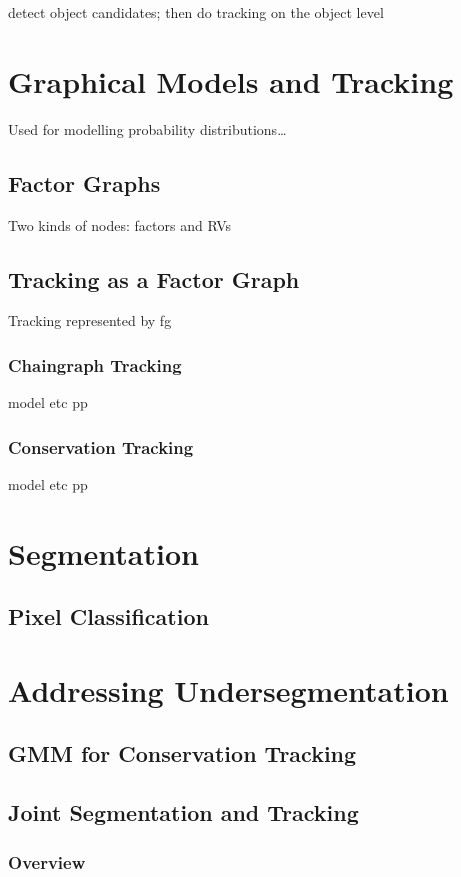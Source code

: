 \documentclass[11pt]{article}
\begin{document}
    detect object candidates; then do tracking on the object level
\section{Graphical Models and Tracking}
\label{sec-4}

  Used for modelling probability distributions\ldots{}
\subsection{Factor Graphs}
\label{sec-4-1}

   Two kinds of nodes: factors and RVs
\subsection{Tracking as a Factor Graph}
\label{sec-4-2}

   Tracking represented by fg
\subsubsection{Chaingraph Tracking}
\label{sec-4-2-1}

    model etc pp
\subsubsection{Conservation Tracking}
\label{sec-4-2-2}

    model etc pp
    
\section{Segmentation}
\label{sec-5}
\subsection{Pixel Classification}
\label{sec-5-1}
\section{Addressing Undersegmentation}
\label{sec-6}
\subsection{GMM for Conservation Tracking}
\label{sec-6-1}
\subsection{Joint Segmentation and Tracking}
\label{sec-6-2}
\subsubsection{Overview}
\label{sec-6-2-1}
\end{document}
